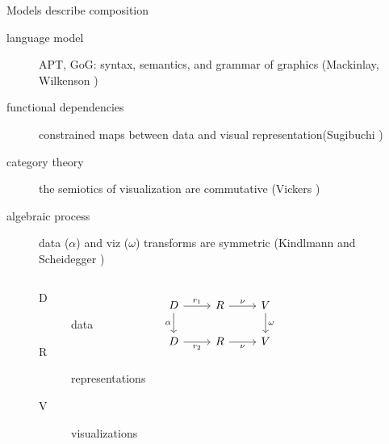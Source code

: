 \begin{frame}{Models describe composition}
    \begin{description}
        \item[language model] APT, GoG: syntax, semantics, and grammar of graphics (Mackinlay, Wilkenson  \cite{mackinlayAutomatingDesignGraphical1986, mackinlayAUTOMATICDESIGNGRAPHICAL1987,wilkinsonGrammarGraphics2005})
        \item[functional dependencies] constrained maps between data and visual representation(Sugibuchi \cite{sugibuchiFramwork2009}) 
        \item[category theory] the semiotics of visualization are commutative (Vickers \cite{vickersUnderstandingViz2013})
        \item[algebraic process] data ($\alpha$) and viz ($\omega$) transforms are symmetric (Kindlmann and Scheidegger \cite{kindlmannAlgebraicProcessVisualization2014})
        \begin{columns}
       
            \begin{description}
                \item[D] data 
                \item[R] representations
                \item[V] visualizations
            \end{description}
            \begin{equation*}
                \begin{tikzcd}[ampersand replacement=\&]
                    D \arrow[d, "\alpha"'] \arrow[r, "r_1"] \& R \arrow[r, "\nu"]  \& V \arrow[d, "\omega"] \\
                    D \arrow[r, "r_2"']                     \& R \arrow[r, "\nu"'] \& V                    
                \end{tikzcd}
                \end{equation*}
       
        \end{columns} 
     
    \end{description}
\end{frame}


